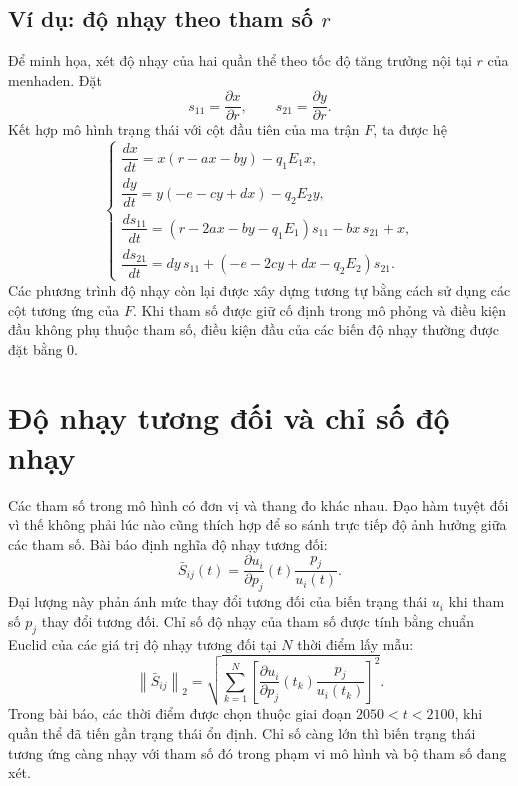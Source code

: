 \subsection{Ví dụ: độ nhạy theo tham số \(r\)}

Để minh họa, xét độ nhạy của hai quần thể theo tốc độ tăng trưởng nội tại \(r\) của menhaden. Đặt
\[
s_{11}=\frac{\partial x}{\partial r},
\qquad
s_{21}=\frac{\partial y}{\partial r}.
\]
Kết hợp mô hình trạng thái với cột đầu tiên của ma trận \(F\), ta được hệ
\begin{equation}
\label{eq:sens_r_example}
\begin{cases}
\dfrac{dx}{dt}=x(r-ax-by)-q_1E_1x,\\[0.35em]
\dfrac{dy}{dt}=y(-e-cy+dx)-q_2E_2y,\\[0.35em]
\dfrac{ds_{11}}{dt}=(r-2ax-by-q_1E_1)s_{11}-bx\,s_{21}+x,\\[0.35em]
\dfrac{ds_{21}}{dt}=dy\,s_{11}+(-e-2cy+dx-q_2E_2)s_{21}.
\end{cases}
\end{equation}
Các phương trình độ nhạy còn lại được xây dựng tương tự bằng cách sử dụng các cột tương ứng của \(F\). Khi tham số được giữ cố định trong mô phỏng và điều kiện đầu không phụ thuộc tham số, điều kiện đầu của các biến độ nhạy thường được đặt bằng 0.

\section{Độ nhạy tương đối và chỉ số độ nhạy}
\label{sec:relative_sensitivity}

Các tham số trong mô hình có đơn vị và thang đo khác nhau. Đạo hàm tuyệt đối vì thế không phải lúc nào cũng thích hợp để so sánh trực tiếp độ ảnh hưởng giữa các tham số. Bài báo định nghĩa độ nhạy tương đối:
\begin{equation}
\label{eq:relative_sensitivity}
\bar{S}_{ij}(t)=
\frac{\partial u_i}{\partial p_j}(t)\frac{p_j}{u_i(t)}.
\end{equation}
Đại lượng này phản ánh mức thay đổi tương đối của biến trạng thái \(u_i\) khi tham số \(p_j\) thay đổi tương đối. Chỉ số độ nhạy của tham số được tính bằng chuẩn Euclid của các giá trị độ nhạy tương đối tại \(N\) thời điểm lấy mẫu:
\begin{equation}
\label{eq:sensitivity_norm}
\left\|\bar{S}_{ij}\right\|_2
=
\sqrt{\sum_{k=1}^{N}
\left[
\frac{\partial u_i}{\partial p_j}(t_k)
\frac{p_j}{u_i(t_k)}
\right]^2}.
\end{equation}
Trong bài báo, các thời điểm được chọn thuộc giai đoạn \(2050<t<2100\), khi quần thể đã tiến gần trạng thái ổn định. Chỉ số càng lớn thì biến trạng thái tương ứng càng nhạy với tham số đó trong phạm vi mô hình và bộ tham số đang xét.

